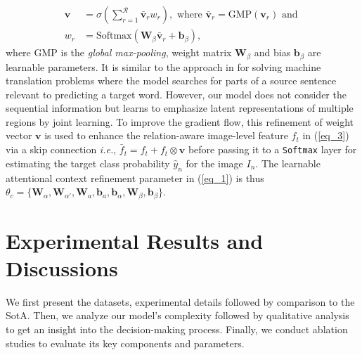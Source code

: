\documentclass[journal]{IEEEtran}
\begin{document}
\begin{equation}
\begin{split}
    \mathbf{v}&=\sigma\left(\sum_{r=1}^{\mathcal{R}}\bar{\mathbf{v}}_r w_r\right), \text{ where } \bar{\mathbf{v}}_r = \text{GMP}(\mathbf{v}_r) \text{ and }\\
    w_r&=\text{Softmax}(\mathbf{W}_\beta \bar{\mathbf{v}}_r + \mathbf{b}_\beta),
\end{split}
\end{equation}
where GMP is the \textit{global max-pooling}, weight matrix $\mathbf{W}_\beta$ and bias $\mathbf{b}_\beta$ are learnable parameters. It is similar to the approach in \cite{BahdanauCB14} for solving machine translation problems where the model searches for parts of a source sentence relevant to predicting a target word. However, our model does not consider the sequential information but learns to emphasize latent representations of multiple regions by joint learning. To improve the gradient flow, this refinement of weight vector $\mathbf{v}$ is used to enhance the relation-aware image-level feature $f_t$ in (\ref{eq_3}) via a skip connection \textit{i.e.}, $\bar{f}_t = f_t + f_t \otimes \mathbf{v}$  before passing it to a \texttt{Softmax} layer for estimating the target class probability $\hat{y}_n$ for the image $I_n$. The learnable attentional context refinement parameter in (\ref{eq_1}) is thus $\theta_c=\{\mathbf{W}_{\alpha}, \mathbf{W}_{\alpha'}, \mathbf{W}_{a}, \mathbf{b}_a,\mathbf{b}_\alpha, \mathbf{W}_\beta, \mathbf{b}_\beta\}$.
\section{Experimental Results and Discussions} \label{experiments}
We first present the datasets, experimental details followed by comparison to the SotA. Then, we analyze our model's complexity followed by qualitative analysis to get an insight into the  decision-making process. Finally, we conduct ablation studies to evaluate its key components and parameters. 
\end{document}
